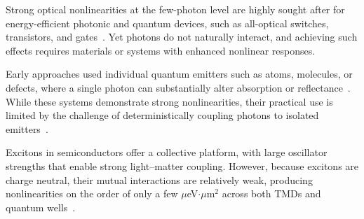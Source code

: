 

Strong optical nonlinearities at the few-photon level are highly sought after for energy-efficient photonic and quantum devices, such as all-optical switches, transistors, and gates~\cite{Hwang2009-rg,Turchette1995-nv,Chang2007-lw,Volz2012-pb}. 
Yet photons do not naturally interact, and achieving such effects requires materials or systems with enhanced nonlinear responses.  

Early approaches used individual quantum emitters such as atoms, molecules, or defects, where a single photon can substantially alter absorption or reflectance~\cite{Birnbaum2005-ix,Schuster2008-nv,Lounis2000-iy,Castelletto2014-pv}. 
While these systems demonstrate strong nonlinearities, their practical use is limited by the challenge of deterministically coupling photons to isolated emitters~\cite{Harris1990-ej,Fushman2008-lk}.  

Excitons in semiconductors offer a collective platform, with large oscillator strengths that enable strong light--matter coupling\cite{Wang2018-my}.
However, because excitons are charge neutral, their mutual interactions are relatively weak, producing nonlinearities on the order of only a few $\mu$eV$\cdot\mu$m$^2$ across both TMDs and quantum wells~\cite{Scuri2018-bn,Shahnazaryan2017-gx}.  

